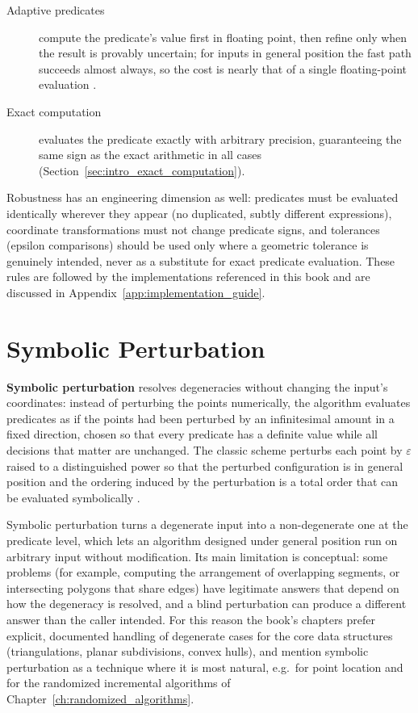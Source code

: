 \begin{description}
  \item[Adaptive predicates] compute the predicate's value first in
    floating point, then refine only when the result is provably
    uncertain; for inputs in general position the fast path succeeds almost
    always, so the cost is nearly that of a single floating-point
    evaluation \cite{shewchuk1997}.
  \item[Exact computation] evaluates the predicate exactly with arbitrary
    precision, guaranteeing the same sign as the exact arithmetic in all
    cases (Section~\ref{sec:intro_exact_computation}).
\end{description}

Robustness has an engineering dimension as well: predicates must be
evaluated identically wherever they appear (no duplicated, subtly different
expressions), coordinate transformations must not change predicate signs,
and tolerances (epsilon comparisons) should be used only where a geometric
tolerance is genuinely intended, never as a substitute for exact predicate
evaluation. These rules are followed by the implementations referenced in
this book and are discussed in Appendix~\ref{app:implementation_guide}.


\section{Symbolic Perturbation}
\label{sec:intro_symbolic_perturbation}

\textbf{Symbolic perturbation} resolves degeneracies without changing the
input's coordinates: instead of perturbing the points numerically, the
algorithm evaluates predicates as if the points had been perturbed by an
infinitesimal amount in a fixed direction, chosen so that every predicate
has a definite value while all decisions that matter are unchanged. The
classic scheme perturbs each point by $\varepsilon$ raised to a
distinguished power so that the perturbed configuration is in general
position and the ordering induced by the perturbation is a total order that
can be evaluated symbolically \cite{edelsbrunner1985}.

Symbolic perturbation turns a degenerate input into a non-degenerate one at
the predicate level, which lets an algorithm designed under general position
run on arbitrary input without modification. Its main limitation is
conceptual: some problems (for example, computing the arrangement of
overlapping segments, or intersecting polygons that share edges) have
legitimate answers that depend on how the degeneracy is resolved, and a
blind perturbation can produce a different answer than the caller intended.
For this reason the book's chapters prefer explicit, documented handling of
degenerate cases for the core data structures (triangulations, planar
subdivisions, convex hulls), and mention symbolic perturbation as a
technique where it is most natural, e.g.\ for point location and for the
randomized incremental algorithms of Chapter~\ref{ch:randomized_algorithms}.

